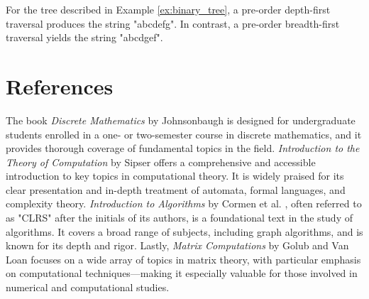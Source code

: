 \begin{example}
For the tree described in Example \ref{ex:binary_tree}, a pre-order depth-first traversal produces the string "abcdefg". In contrast, a pre-order breadth-first traversal yields the string "abcdgef".
\end{example}

%
%

\section*{References}

The book \emph{Discrete Mathematics} by Johnsonbaugh \cite{johnsonbaugh2009discrete} is designed for undergraduate students enrolled in a one- or two-semester course in discrete mathematics, and it provides thorough coverage of fundamental topics in the field. \emph{Introduction to the Theory of Computation} by Sipser \cite{sipser2012introduction} offers a comprehensive and accessible introduction to key topics in computational theory. It is widely praised for its clear presentation and in-depth treatment of automata, formal languages, and complexity theory. \emph{Introduction to Algorithms} by Cormen et al. \cite{cormen1990introduction}, often referred to as "CLRS" after the initials of its authors, is a foundational text in the study of algorithms. It covers a broad range of subjects, including graph algorithms, and is known for its depth and rigor. Lastly, \emph{Matrix Computations} by Golub and Van Loan \cite{golub2013matrix} focuses on a wide array of topics in matrix theory, with particular emphasis on computational techniques—making it especially valuable for those involved in numerical and computational studies.








